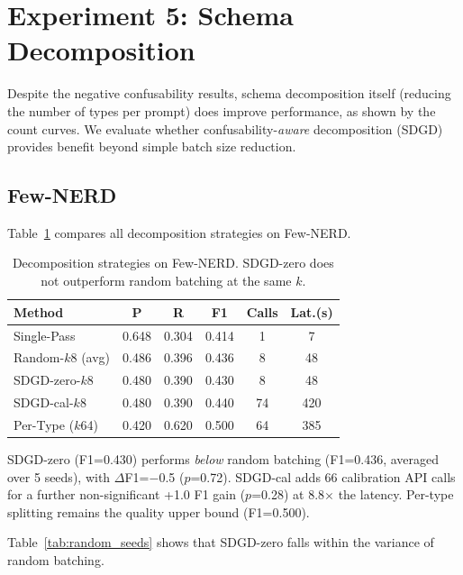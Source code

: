 \documentclass[11pt,a4paper]{article}
\begin{document}
\section{Experiment 5: Schema Decomposition}

Despite the negative confusability results, schema decomposition itself (reducing the number of types per prompt) does improve performance, as shown by the count curves.
We evaluate whether confusability-\emph{aware} decomposition (SDGD) provides benefit beyond simple batch size reduction.

\subsection{Few-NERD}

Table~\ref{tab:decomp_fewnerd} compares all decomposition strategies on Few-NERD.

\begin{table}[h]
\centering
\small
\begin{tabular}{lccccc}
\toprule
Method & P & R & F1 & Calls & Lat.(s) \\
\midrule
Single-Pass      & 0.648 & 0.304 & 0.414 &  1 &   7 \\
Random-$k$8 (avg)& 0.486 & 0.396 & 0.436 &  8 &  48 \\
SDGD-zero-$k$8   & 0.480 & 0.390 & 0.430 &  8 &  48 \\
SDGD-cal-$k$8    & 0.480 & 0.390 & 0.440 & 74 & 420 \\
Per-Type ($k$64) & 0.420 & 0.620 & 0.500 & 64 & 385 \\
\bottomrule
\end{tabular}
\caption{Decomposition strategies on Few-NERD. SDGD-zero does not outperform random batching at the same $k$.}
\label{tab:decomp_fewnerd}
\end{table}

SDGD-zero (F1=0.430) performs \emph{below} random batching (F1=0.436, averaged over 5 seeds), with $\Delta$F1=$-$0.5 ($p$=0.72).
SDGD-cal adds 66 calibration API calls for a further non-significant +1.0 F1 gain ($p$=0.28) at 8.8$\times$ the latency.
Per-type splitting remains the quality upper bound (F1=0.500).

Table~\ref{tab:random_seeds} shows that SDGD-zero falls within the variance of random batching.
\end{document}
